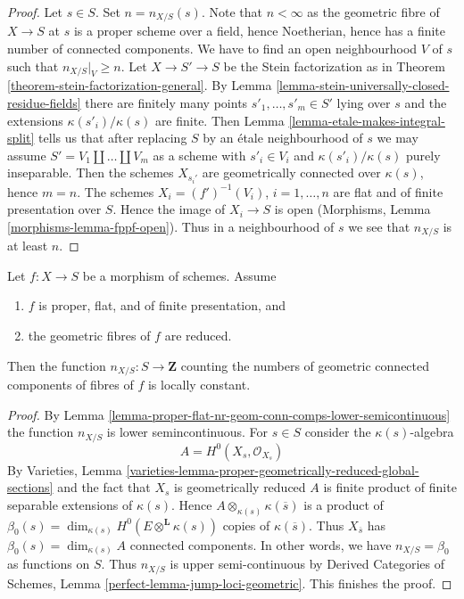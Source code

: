 \begin{proof}
Let $s \in S$. Set $n = n_{X/S}(s)$. Note that $n < \infty$ as the geometric
fibre of $X \to S$ at $s$ is a proper scheme over a field, hence Noetherian,
hence has a finite number of connected components. We have to find an open
neighbourhood $V$ of $s$ such that $n_{X/S}|_V \geq n$.
Let $X \to S' \to S$ be the Stein factorization as in
Theorem \ref{theorem-stein-factorization-general}.
By Lemma \ref{lemma-stein-universally-closed-residue-fields}
there are finitely many points $s'_1, \ldots, s'_m \in S'$ lying over $s$
and the extensions $\kappa(s'_i)/\kappa(s)$ are finite.
Then Lemma \ref{lemma-etale-makes-integral-split}
tells us that after replacing $S$ by an \'etale neighbourhood
of $s$ we may assume $S' = V_1 \amalg \ldots \amalg V_m$ as a scheme
with $s'_i \in V_i$ and $\kappa(s'_i)/\kappa(s)$ purely inseparable.
Then the schemes $X_{s_i'}$ are geometrically connected over
$\kappa(s)$, hence $m = n$. The schemes
$X_i = (f')^{-1}(V_i)$, $i = 1, \ldots, n$
are flat and of finite presentation over $S$. Hence the image of $X_i \to S$
is open (Morphisms, Lemma \ref{morphisms-lemma-fppf-open}).
Thus in a neighbourhood of $s$ we see that $n_{X/S}$ is
at least $n$.
\end{proof}

\begin{lemma}
\label{lemma-proper-flat-geom-red}
Let $f : X \to S$ be a morphism of schemes. Assume
\begin{enumerate}
\item $f$ is proper, flat, and of finite presentation, and
\item the geometric fibres of $f$ are reduced.
\end{enumerate}
Then the function $n_{X/S} : S \to \mathbf{Z}$
counting the numbers of geometric connected components
of fibres of $f$ is locally constant.
\end{lemma}

\begin{proof}
By Lemma \ref{lemma-proper-flat-nr-geom-conn-comps-lower-semicontinuous}
the function $n_{X/S}$ is lower semincontinuous.
For $s \in S$ consider the $\kappa(s)$-algebra
$$
A = H^0(X_s, \mathcal{O}_{X_s})
$$
By Varieties, Lemma
\ref{varieties-lemma-proper-geometrically-reduced-global-sections}
and the fact that $X_s$ is geometrically reduced
$A$ is finite product of finite separable extensions of $\kappa(s)$.
Hence $A \otimes_{\kappa(s)} \kappa(\overline{s})$ is a product
of $\beta_0(s) = \dim_{\kappa(s)} H^0(E \otimes^\mathbf{L} \kappa(s))$
copies of $\kappa(\overline{s})$. Thus
$X_{\overline{s}}$ has $\beta_0(s) = \dim_{\kappa(s)} A$
connected components. In other words, we have $n_{X/S} = \beta_0$
as functions on $S$. Thus $n_{X/S}$ is upper semi-continuous by
Derived Categories of Schemes, Lemma \ref{perfect-lemma-jump-loci-geometric}.
This finishes the proof.
\end{proof}

